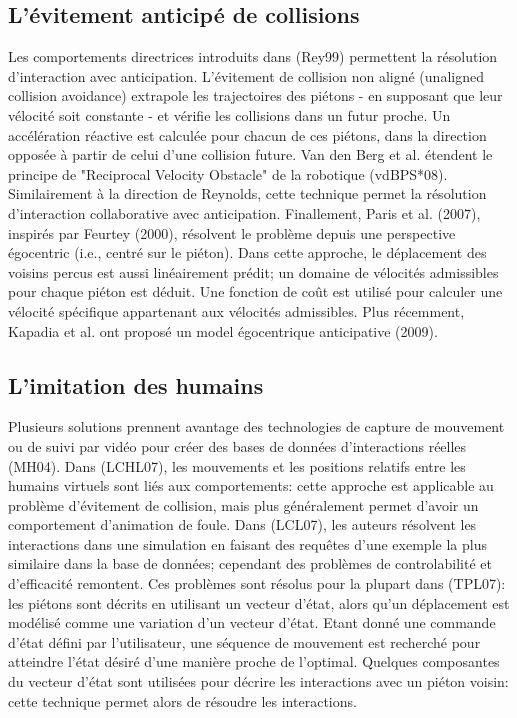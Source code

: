 \documentclass[11pt]{article}
\begin{document}
\subsection*{L'évitement anticipé de collisions}

Les comportements directrices introduits dans (Rey99) permettent la résolution d'interaction avec anticipation. L'évitement de collision non aligné (unaligned collision avoidance) extrapole les trajectoires des piétons - en supposant que leur vélocité soit constante - et vérifie les collisions dans un futur proche. Un accélération réactive est calculée pour chacun de ces piétons, dans la direction opposée à partir de celui d'une collision future. Van den Berg et al. étendent le principe de "Reciprocal Velocity Obstacle" de la robotique (vdBPS*08).  Similairement à la direction de Reynolds, cette technique permet la résolution d'interaction collaborative avec anticipation. Finallement, Paris et al. (2007), inspirés par Feurtey (2000), résolvent le problème depuis une perspective égocentric (i.e., centré sur le piéton). Dans cette approche, le déplacement des voisins percus est aussi linéairement prédit; un domaine de vélocités admissibles pour chaque piéton est déduit. Une fonction de coût est utilisé pour calculer une vélocité spécifique appartenant aux vélocités admissibles. Plus récemment, Kapadia et al. ont proposé un model égocentrique anticipative (2009).

\subsection*{L'imitation des humains}

Plusieurs solutions prennent avantage des technologies de capture de mouvement ou de suivi par vidéo pour créer des bases de données d'interactions réelles (MH04). Dans (LCHL07), les mouvements et les positions relatifs entre les humains virtuels sont liés aux comportements: cette approche est applicable au problème d'évitement de collision, mais plus généralement permet d'avoir un comportement d'animation de foule. Dans (LCL07), les auteurs résolvent les interactions dans une simulation en faisant des requêtes d'une exemple la plus similaire dans la base de données; cependant des problèmes de controlabilité et d'efficacité remontent. Ces problèmes sont résolus pour la plupart dans (TPL07): les piétons sont décrits en utilisant un vecteur d'état, alors qu'un déplacement est modélisé comme une variation d'un vecteur d'état. Etant donné une commande d'état défini par l'utilisateur, une séquence de mouvement est recherché pour atteindre l'état désiré d'une manière proche de l'optimal. Quelques composantes du vecteur d'état sont utilisées pour décrire les interactions avec un piéton voisin: cette technique permet alors de résoudre les interactions.
\end{document}
